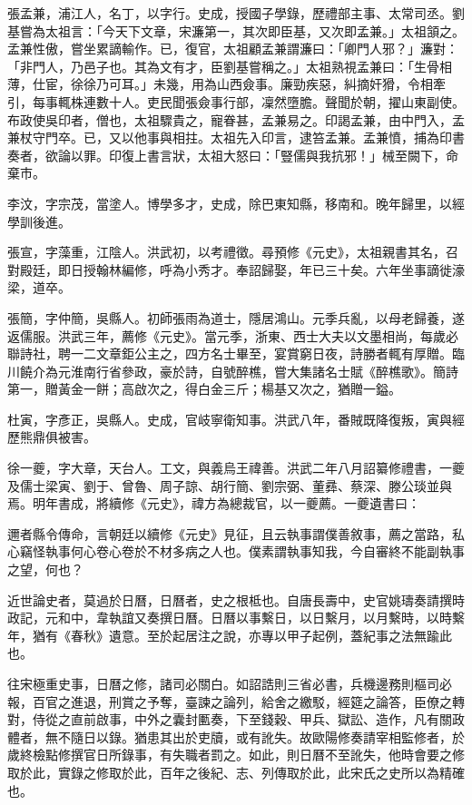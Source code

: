 \begin{pinyinscope}
張孟兼，浦江人，名丁，以字行。史成，授國子學錄，歷禮部主事、太常司丞。劉基嘗為太祖言：「今天下文章，宋濂第一，其次即臣基，又次即孟兼。」太祖頷之。孟兼性傲，嘗坐累謫輸作。已，復官，太祖顧孟兼謂濂曰：「卿門人邪？」濂對：「非門人，乃邑子也。其為文有才，臣劉基嘗稱之。」太祖熟視孟兼曰：「生骨相薄，仕宦，徐徐乃可耳。」未幾，用為山西僉事。廉勁疾惡，糾摘奸猾，令相牽引，每事輒株連數十人。吏民聞張僉事行部，凜然墮膽。聲聞於朝，擢山東副使。布政使吳印者，僧也，太祖驟貴之，寵眷甚，孟兼易之。印謁孟兼，由中門入，孟兼杖守門卒。已，又以他事與相拄。太祖先入印言，逮笞孟兼。孟兼憤，捕為印書奏者，欲論以罪。印復上書言狀，太祖大怒曰：「豎儒與我抗邪！」械至闕下，命棄市。

李汶，字宗茂，當塗人。博學多才，史成，除巴東知縣，移南和。晚年歸里，以經學訓後進。

張宣，字藻重，江陰人。洪武初，以考禮徵。尋預修《元史》，太祖親書其名，召對殿廷，即日授翰林編修，呼為小秀才。奉詔歸娶，年已三十矣。六年坐事謫徙濠梁，道卒。

張簡，字仲簡，吳縣人。初師張雨為道士，隱居鴻山。元季兵亂，以母老歸養，遂返儒服。洪武三年，薦修《元史》。當元季，浙東、西士大夫以文墨相尚，每歲必聯詩社，聘一二文章鉅公主之，四方名士畢至，宴賞窮日夜，詩勝者輒有厚贈。臨川饒介為元淮南行省參政，豪於詩，自號醉樵，嘗大集諸名士賦《醉樵歌》。簡詩第一，贈黃金一餅；高啟次之，得白金三斤；楊基又次之，猶贈一鎰。

杜寅，字彥正，吳縣人。史成，官岐寧衛知事。洪武八年，番賊既降復叛，寅與經歷熊鼎俱被害。

徐一夔，字大章，天台人。工文，與義烏王禕善。洪武二年八月詔纂修禮書，一夔及儒士梁寅、劉于、曾魯、周子諒、胡行簡、劉宗弼、董彞、蔡深、滕公琰並與焉。明年書成，將續修《元史》，禕方為總裁官，以一夔薦。一夔遺書曰：

邇者縣令傳命，言朝廷以續修《元史》見征，且云執事謂僕善敘事，薦之當路，私心竊怪執事何心卷心卷於不材多病之人也。僕素謂執事知我，今自審終不能副執事之望，何也？

近世論史者，莫過於日曆，日曆者，史之根柢也。自唐長壽中，史官姚璹奏請撰時政記，元和中，韋執誼又奏撰日曆。日曆以事繫日，以日繫月，以月繫時，以時繫年，猶有《春秋》遺意。至於起居注之說，亦專以甲子起例，蓋紀事之法無踰此也。

往宋極重史事，日曆之修，諸司必關白。如詔誥則三省必書，兵機邊務則樞司必報，百官之進退，刑賞之予奪，臺諫之論列，給舍之繳駁，經筵之論答，臣僚之轉對，侍從之直前啟事，中外之囊封匭奏，下至錢穀、甲兵、獄訟、造作，凡有關政體者，無不隨日以錄。猶患其出於吏牘，或有訛失。故歐陽修奏請宰相監修者，於歲終檢點修撰官日所錄事，有失職者罰之。如此，則日曆不至訛失，他時會要之修取於此，實錄之修取於此，百年之後紀、志、列傳取於此，此宋氏之史所以為精確也。


\end{pinyinscope}
